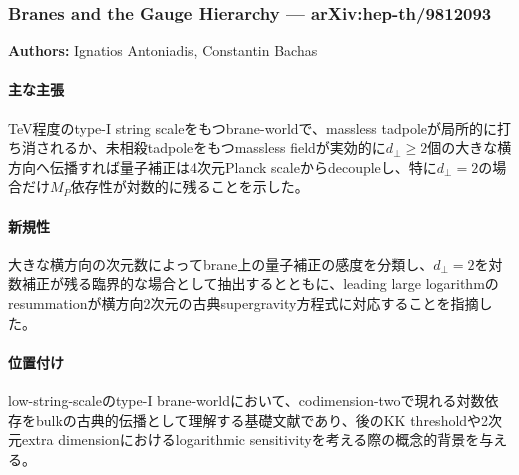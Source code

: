 \subsubsection{Branes and the Gauge Hierarchy --- arXiv:hep-th/9812093}

\textbf{Authors:} Ignatios Antoniadis, Constantin Bachas

\paragraph{主な主張}
TeV程度のtype-I string scaleをもつbrane-worldで、massless tadpoleが局所的に打ち消されるか、未相殺tadpoleをもつmassless fieldが実効的に$d_\perp\ge 2$個の大きな横方向へ伝播すれば量子補正は4次元Planck scaleからdecoupleし、特に$d_\perp=2$の場合だけ$M_P$依存性が対数的に残ることを示した\cite{Antoniadis:1998Branes}。

\paragraph{新規性}
大きな横方向の次元数によってbrane上の量子補正の感度を分類し、$d_\perp=2$を対数補正が残る臨界的な場合として抽出するとともに、leading large logarithmのresummationが横方向2次元の古典supergravity方程式に対応することを指摘した。

\paragraph{位置付け}
low-string-scaleのtype-I brane-worldにおいて、codimension-twoで現れる対数依存をbulkの古典的伝播として理解する基礎文献であり、後のKK thresholdや2次元extra dimensionにおけるlogarithmic sensitivityを考える際の概念的背景を与える。
